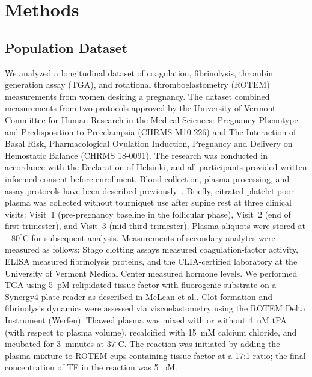 \section{Methods}
\label{sec:methods}

\subsection{Population Dataset}
\label{sec:dataset}
We analyzed a longitudinal dataset of coagulation, fibrinolysis, thrombin generation
assay (TGA), and rotational thromboelastometry (ROTEM) measurements from women
desiring a pregnancy. The dataset combined measurements from two protocols approved by the
University of Vermont Committee for Human Research in the Medical Sciences: Pregnancy
Phenotype and Predisposition to Preeclampsia (CHRMS M10-226) and The Interaction of Basal
Risk, Pharmacological Ovulation Induction, Pregnancy and Delivery on Hemostatic Balance
(CHRMS 18-0091). The research was conducted in accordance with the Declaration of Helsinki,
and all participants provided written informed consent before enrollment.
Blood collection, plasma processing, and assay protocols have been described
previously~\citep{McLean2012TGA,Hale2012,Psoinos2021,Bernstein2016}. Briefly, citrated platelet-poor plasma
was collected without tourniquet use after supine rest at three clinical visits:
Visit~1 (pre-pregnancy baseline in the follicular phase), Visit~2 (end of first
trimester), and Visit~3 (mid-third trimester). Plasma aliquots were stored at
$-80^{\circ}$C for subsequent analysis. Measurements of secondary analytes were
measured as follows: Stago clotting assays measured coagulation-factor activity, ELISA
measured fibrinolysis proteins, and the CLIA-certified laboratory at the University of Vermont
Medical Center measured hormone levels. We performed TGA using 5~pM relipidated tissue factor with
fluorogenic substrate on a Synergy4 plate reader as described
in McLean et al.\citep{McLean2012TGA}. Clot formation and fibrinolysis dynamics were assessed via
viscoelastometry using the ROTEM Delta Instrument (Werfen). Thawed plasma was mixed
with or without 4~nM tPA (with respect to plasma volume), recalcified with 15~mM
calcium chloride, and incubated for 3~minutes at 37$^{\circ}$C. The reaction was
initiated by adding the plasma mixture to ROTEM cups containing tissue factor at a
17:1 ratio; the final concentration of TF in the reaction was 5~pM.

